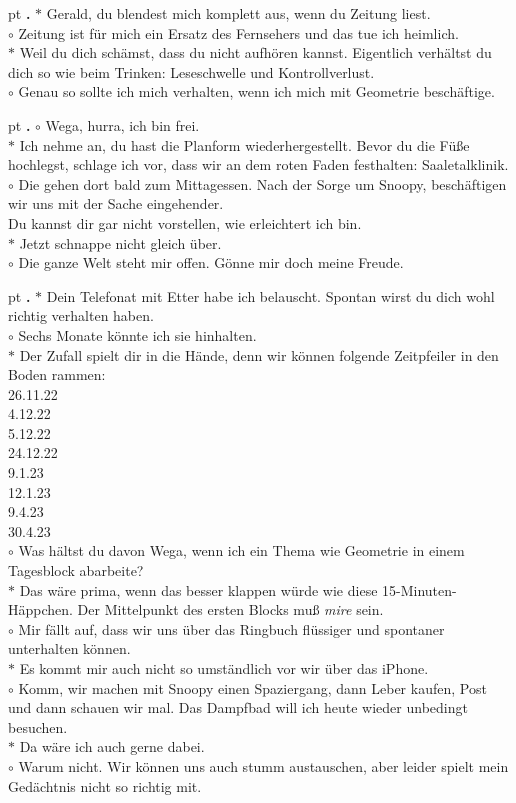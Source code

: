 \documentclass[10pt,a4paper]{article}
\newcounter{notec}
\newcommand\notep[1]{%
  \stepcounter{notec}
  \vskip #1pt
  {\bf\arabic{notec}.}
}
\begin{document}
\begin{mdframed}[style=daystyle]
  \notep 4 $\ast$ Gerald, du blendest mich komplett aus, wenn du Zeitung liest. \\
  $\circ$ Zeitung ist für mich ein Ersatz des Fernsehers und das tue ich
  heimlich. \\
  $\ast$ Weil du dich schämst, dass du nicht aufhören kannst. Eigentlich
  verhältst du dich so wie beim Trinken: Leseschwelle und Kontrollverlust. \\
  $\circ$ Genau so sollte ich mich verhalten, wenn ich mich mit Geometrie
  beschäftige.
  
  \notep 4 $\circ$ Wega, hurra, ich bin frei. \\
  $\ast$ Ich nehme an, du hast die Planform wiederhergestellt. Bevor du die
  Füße hochlegst, schlage ich vor, dass wir an dem roten Faden festhalten:
  Saaletalklinik. \\
  $\circ$ Die gehen dort bald zum Mittagessen. Nach der Sorge um Snoopy,
  beschäftigen wir uns mit der Sache eingehender. \\
  Du kannst dir gar nicht vorstellen, wie erleichtert ich bin. \\
  $\ast$ Jetzt schnappe nicht gleich über. \\
  $\circ$ Die ganze Welt steht mir offen. Gönne mir doch meine Freude.

  \notep 4 $\ast$ Dein Telefonat mit Etter habe ich belauscht. Spontan wirst du
  dich wohl richtig verhalten haben. \\
  $\circ$ Sechs Monate könnte ich sie hinhalten. \\
  $\ast$ Der Zufall spielt dir in die Hände, denn wir können folgende
  Zeitpfeiler in den Boden rammen: \\
  26.11.22 \\
  4.12.22 \\
  5.12.22 \\
  24.12.22 \\
  9.1.23 \\
  12.1.23 \\
  9.4.23 \\
  30.4.23 \\
  $\circ$ Was hältst du davon Wega, wenn ich ein Thema wie Geometrie in einem
  Tagesblock abarbeite? \\
  $\ast$ Das wäre prima, wenn das besser klappen würde wie diese
  15-Minuten-Häppchen. Der Mittelpunkt des ersten Blocks muß {\it mire} sein. \\
  $\circ$ Mir fällt auf, dass wir uns über das Ringbuch flüssiger und spontaner
  unterhalten können. \\
  $\ast$ Es kommt mir auch nicht so umständlich vor wir über das iPhone. \\
  $\circ$ Komm, wir machen mit Snoopy einen Spaziergang, dann Leber kaufen,
  Post und dann schauen wir mal. Das Dampfbad will ich heute wieder
  unbedingt besuchen. \\
  $\ast$ Da wäre ich auch gerne dabei. \\
  $\circ$ Warum nicht. Wir können uns auch stumm austauschen, aber leider spielt
  mein Gedächtnis nicht so richtig mit.


\end{mdframed}
\end{document}
